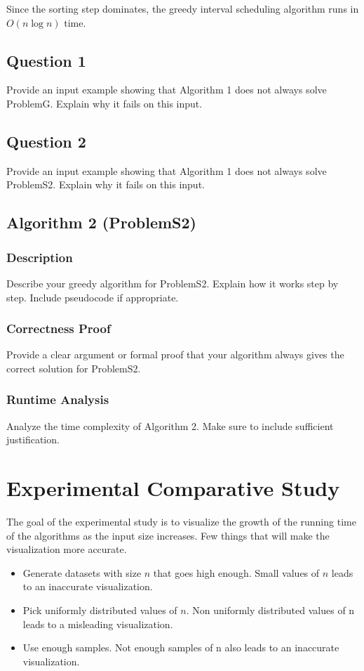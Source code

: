 \documentclass{article}
\begin{document}
Since the sorting step dominates, the greedy interval scheduling algorithm runs in $O(n \log n)$ time.

\subsection{Question 1}
{\color{red} Provide an input example showing that Algorithm 1 does not always solve ProblemG. Explain why it fails on this input.}

\subsection{Question 2}
{\color{red} Provide an input example showing that Algorithm 1 does not always solve ProblemS2. Explain why it fails on this input.}

\subsection{Algorithm 2 (ProblemS2)}

\subsubsection{Description}
{\color{red} Describe your greedy algorithm for ProblemS2. Explain how it works step by step. Include pseudocode if appropriate.}

\subsubsection{Correctness Proof}
{\color{red} Provide a clear argument or formal proof that your algorithm always gives the correct solution for ProblemS2.}

\subsubsection{Runtime Analysis}
{\color{red} Analyze the time complexity of Algorithm 2. Make sure to include sufficient
justification.}

\section{Experimental Comparative Study}

{\color{red}The goal of the experimental study is to visualize the growth of the running time of the algorithms as the input size increases. Few things that will make the visualization more accurate.

\begin{itemize}
    \item Generate datasets with size $n$ that goes high enough. Small values of $n$ leads to an inaccurate visualization.
    \item Pick uniformly distributed values of $n$. Non uniformly distributed values of n leads to a misleading visualization.
    \item Use enough samples. Not enough samples of n also leads to an inaccurate visualization.
\end{itemize}
}
\end{document}
